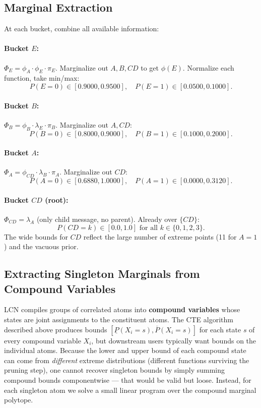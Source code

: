 \documentclass[11pt]{article}
\begin{document}
\subsection{Marginal Extraction}

At each bucket, combine all available information:

\paragraph{Bucket $E$:}
$\Phi_E = \phi_A \cdot \phi_E \cdot \pi_E$. Marginalize out $A, B, CD$ to get
$\phi(E)$. Normalize each function, take min/max:
\[
  P(E{=}0) \in [0.9000, 0.9500], \quad P(E{=}1) \in [0.0500, 0.1000].
\]

\paragraph{Bucket $B$:}
$\Phi_B = \phi_B \cdot \lambda_E \cdot \pi_B$. Marginalize out $A, CD$:
\[
  P(B{=}0) \in [0.8000, 0.9000], \quad P(B{=}1) \in [0.1000, 0.2000].
\]

\paragraph{Bucket $A$:}
$\Phi_A = \phi_{CD} \cdot \lambda_B \cdot \pi_A$. Marginalize out $CD$:
\[
  P(A{=}0) \in [0.6880, 1.0000], \quad P(A{=}1) \in [0.0000, 0.3120].
\]

\paragraph{Bucket $CD$ (root):}
$\Phi_{CD} = \lambda_A$ (only child message, no parent). Already over $\{CD\}$:
\[
  P(CD{=}k) \in [0.0, 1.0] \text{ for all } k \in \{0,1,2,3\}.
\]
The wide bounds for $CD$ reflect the large number of extreme points (11 for $A{=}1$)
and the vacuous prior.

\subsection{Extracting Singleton Marginals from Compound Variables}

LCN compiles groups of correlated atoms into \textbf{compound variables} whose
states are joint assignments to the constituent atoms. The CTE algorithm described
above produces bounds $[\underline{P}(X_i{=}s), \overline{P}(X_i{=}s)]$ for each
state $s$ of every compound variable $X_i$, but downstream users typically want
bounds on the individual atoms. Because the lower and upper bound of each
compound state can come from \emph{different} extreme distributions (different
functions surviving the pruning step), one cannot recover singleton bounds by
simply summing compound bounds componentwise --- that would be valid but loose.
Instead, for each singleton atom we solve a small linear program over the
compound marginal polytope.
\end{document}
